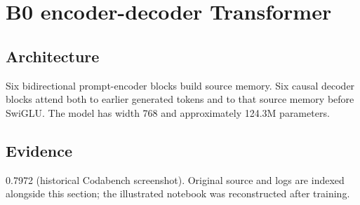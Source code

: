 \section{B0 encoder-decoder Transformer}
\subsection{Architecture} Six bidirectional prompt-encoder blocks build source memory. Six causal decoder blocks attend both to earlier generated tokens and to that source memory before SwiGLU. The model has width 768 and approximately 124.3M parameters.
\subsection{Evidence} 0.7972 (historical Codabench screenshot). Original source and logs are indexed alongside this section; the illustrated notebook was reconstructed after training.
